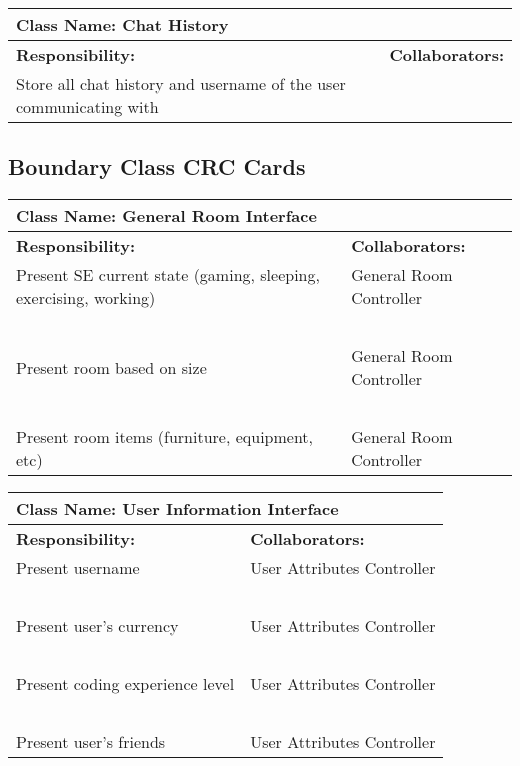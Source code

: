 \documentclass[]{article}
\begin{document}
\begin{table}[H]
    \centering
    \begin{tabular}{|p{5cm}|p{5cm}|}
        \hline
        \multicolumn{2}{|l|}{\textbf{Class Name:} Chat History}\\
        \hline
        \textbf{Responsibility:} & \textbf{Collaborators:}\\
        \hline
        Store all chat history and username of the user communicating with  & ~\\
        \hline
    \end{tabular}
\end{table}

\subsection{Boundary Class CRC Cards}
\label{sec:boundary_class_CRC_cards}

\begin{table}[H]
    \centering
    \begin{tabular}{|p{5cm}|p{5cm}|}
        \hline
        \multicolumn{2}{|l|}{\textbf{Class Name:} General Room Interface}\\
        \hline
        \textbf{Responsibility:} & \textbf{Collaborators:}\\
        \hline
        Present SE current state (gaming, sleeping, exercising, working) & General Room Controller\\
        ~ & ~\\
        Present room based on size & General Room Controller\\
        ~ & ~\\
        Present room items (furniture, equipment, etc) & General Room Controller\\
        \hline
    \end{tabular}
\end{table}

\begin{table}[H]
    \centering
    \begin{tabular}{|p{5cm}|p{5cm}|}
        \hline
        \multicolumn{2}{|l|}{\textbf{Class Name:} User Information Interface}\\
        \hline
        \textbf{Responsibility:} & \textbf{Collaborators:}\\
        \hline
        Present username & User Attributes Controller\\
        ~ & ~\\
        Present user’s currency & User Attributes Controller\\
        ~ & ~\\
        Present coding experience level & User Attributes Controller\\
        ~ & ~\\
        Present user’s friends & User Attributes Controller\\
        \hline
    \end{tabular}
\end{table}
\end{document}
